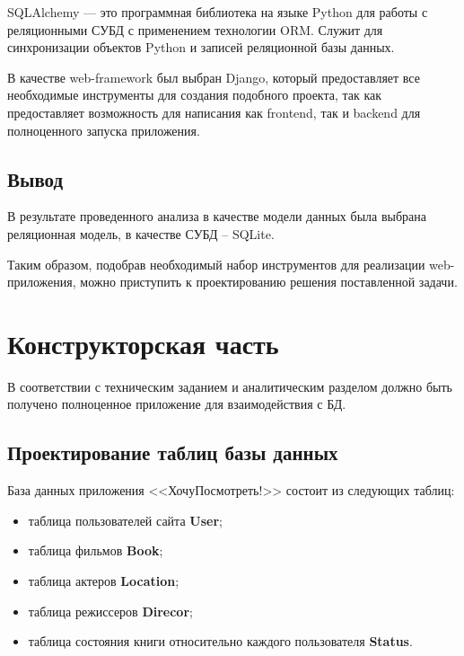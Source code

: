 \documentclass[12pt]{article}
\begin{document}
SQLAlchemy — это программная библиотека на языке Python для работы с реляционными СУБД с применением технологии ORM. Служит для синхронизации объектов Python и записей реляционной базы данных.

В качестве web-framework был выбран Django, который предоставляет все необходимые инструменты для создания подобного проекта, так как предоставляет возможность для написания как frontend, так и backend для полноценного запуска приложения.

\subsection{Вывод}%
\setcounter{subsection}{6}

В результате проведенного анализа в качестве модели данных была выбрана реляционная модель, в качестве СУБД – SQLite.

Таким образом, подобрав необходимый набор инструментов для реализации web-приложения, можно приступить к проектированию решения поставленной задачи.


\newpage
\section{Конструкторская часть}%
\setcounter{section}{2}

В соответствии с техническим заданием и аналитическим разделом должно быть получено полноценное приложение для взаимодействия с БД.

\subsection{Проектирование таблиц базы данных}%
\setcounter{subsection}{1}

База данных приложения <<ХочуПосмотреть!>> состоит из следующих таблиц:
\begin{itemize}
	\item таблица пользователей сайта {\bf User};
	\item таблица фильмов {\bf Book};
	\item таблица актеров {\bf Location};
	\item таблица режиссеров {\bf Direcor};
	\item таблица состояния книги относительно каждого пользователя {\bf Status}.
\end{itemize}
\end{document}
